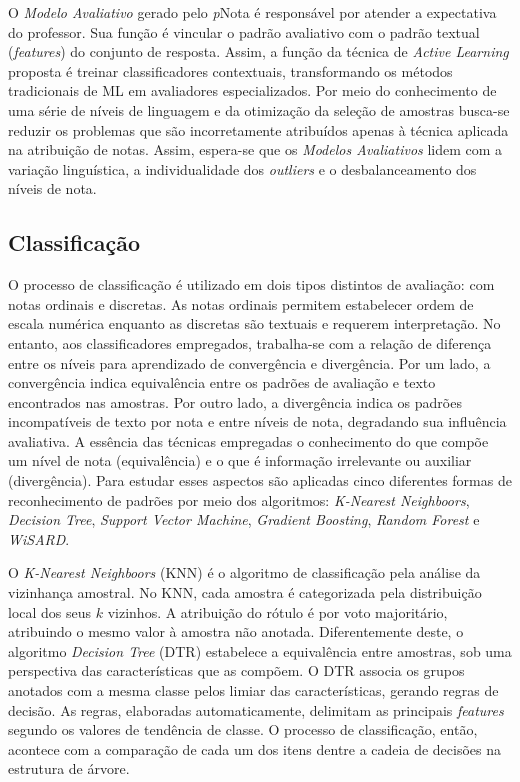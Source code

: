 O \textit{Modelo Avaliativo} gerado pelo \textit{p}Nota é responsável por atender a expectativa do professor. Sua função é vincular o padrão avaliativo com o padrão textual (\textit{features}) do conjunto de resposta. Assim, a função da técnica de \textit{Active Learning} proposta é treinar classificadores contextuais, transformando os métodos tradicionais de ML em avaliadores especializados. Por meio do conhecimento de uma série de níveis de linguagem e da otimização da seleção de amostras busca-se reduzir os problemas que são incorretamente atribuídos apenas à técnica aplicada na atribuição de notas. Assim, espera-se que os \textit{Modelos Avaliativos} lidem com a variação linguística, a individualidade dos \textit{outliers} e o desbalanceamento dos níveis de nota.


\subsection{Classificação}
\label{subsec-classificacao}

O processo de classificação é utilizado em dois tipos distintos de avaliação: com notas ordinais e discretas. As notas ordinais permitem estabelecer ordem de escala numérica enquanto as discretas são textuais e requerem interpretação. No entanto, aos classificadores empregados, trabalha-se com a relação de diferença entre os níveis para aprendizado de convergência e divergência. Por um lado, a convergência indica equivalência entre os padrões de avaliação e texto encontrados nas amostras. Por outro lado, a divergência indica os padrões incompatíveis de texto por nota e entre níveis de nota, degradando sua influência avaliativa. A essência das técnicas empregadas o conhecimento do que compõe um nível de nota (equivalência) e o que é informação irrelevante ou auxiliar (divergência). Para estudar esses aspectos são aplicadas cinco diferentes formas de reconhecimento de padrões por meio dos algoritmos: \textit{K-Nearest Neighboors}, \textit{Decision Tree}, \textit{Support Vector Machine}, \textit{Gradient Boosting}, \textit{Random Forest} e \textit{WiSARD}.

O \textit{K-Nearest Neighboors} (KNN) é o algoritmo de classificação pela análise da vizinhança amostral. No KNN, cada amostra é categorizada pela distribuição local dos seus $ k $ vizinhos. A atribuição do rótulo é por voto majoritário, atribuindo o mesmo valor à amostra não anotada. Diferentemente deste, o algoritmo \textit{Decision Tree} (DTR) estabelece a equivalência entre amostras, sob uma perspectiva das características que as compõem. O DTR associa os grupos anotados com a mesma classe pelos limiar das características, gerando regras de decisão. As regras, elaboradas automaticamente, delimitam as principais \textit{features} segundo os valores de tendência de classe. O processo de classificação, então, acontece com a comparação de cada um dos itens dentre a cadeia de decisões na estrutura de árvore.

